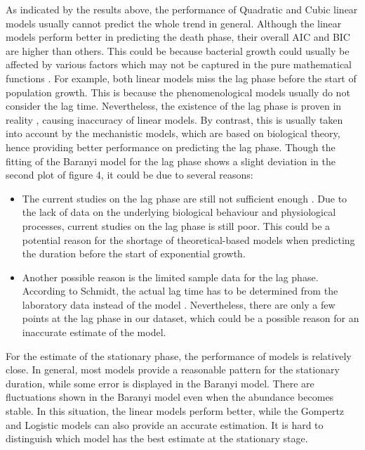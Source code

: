 \documentclass[11pt, oneside]{article}
\begin{document}
	As indicated by the results above, the performance of Quadratic and Cubic linear models usually cannot predict the whole trend in general. Although the linear models perform better in predicting the death phase, their overall AIC and BIC are higher than others. This could be because bacterial growth could usually be affected by various factors which may not be captured in the pure mathematical functions \cite{sutherland2002behavioural}. For example, both linear models miss the lag phase before the start of population growth. This is because the phenomenological models usually do not consider the lag time. Nevertheless, the existence of the lag phase is proven in reality \cite{rolfe2012lag}, causing inaccuracy of linear models. By contrast, this is usually taken into account by the mechanistic models, which are based on biological theory, hence providing better performance on predicting the lag phase. Though the fitting of the Baranyi model for the lag phase shows a slight deviation in the second plot of figure 4, it could be due to several reasons:
	\begin{itemize}
	\item The current studies on the lag phase are still not sufficient enough \cite{rolfe2012lag}. Due to the lack of data on the underlying biological behaviour and physiological processes, current studies on the lag phase is still poor. This could be a potential reason for the shortage of theoretical-based models when predicting the duration before the start of exponential growth.
	\item Another possible reason is the limited sample data for the lag phase. According to Schmidt, the actual lag time has to be determined from the laboratory data instead of the model \cite{Ylmaz2011IdentifiabilityOB}. Nevertheless, there are only a few points at the lag phase in our dataset, which could be a possible reason for an inaccurate estimate of the model.
	\end{itemize}
	\noindent For the estimate of the stationary phase, the performance of models is relatively close. In general, most models provide a reasonable pattern for the stationary duration, while some error is displayed in the Baranyi model. There are fluctuations shown in the Baranyi model even when the abundance becomes stable. In this situation, the linear models perform better, while the Gompertz and Logistic models can also provide an accurate estimation. It is hard to distinguish which model has the best estimate at the stationary stage.
	\bigbreak
\end{document}
